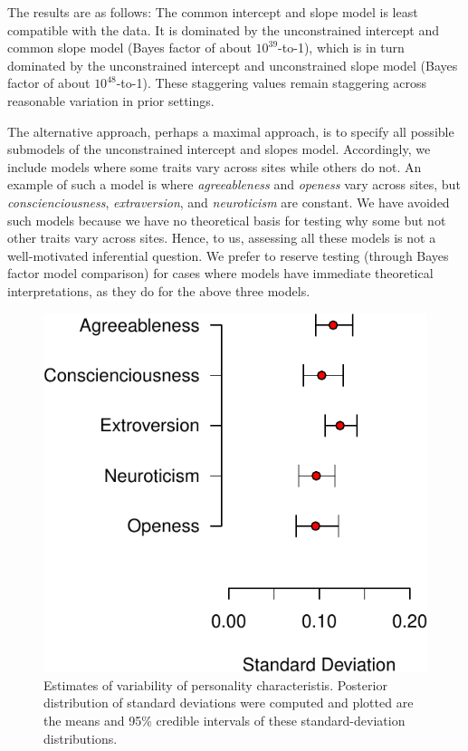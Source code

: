 \documentclass[english,man]{apa6}
\theoremstyle{definition}
\theoremstyle{definition}
\theoremstyle{remark}
\begin{document}
The results are as follows: The common intercept and slope model is
least compatible with the data. It is dominated by the unconstrained
intercept and common slope model (Bayes factor of about
\(10^{39}\)-to-1), which is in turn dominated by the unconstrained
intercept and unconstrained slope model (Bayes factor of about
\(10^{48}\)-to-1). These staggering values remain staggering across
reasonable variation in prior settings.

The alternative approach, perhaps a maximal approach, is to specify all
possible submodels of the unconstrained intercept and slopes model.
Accordingly, we include models where some traits vary across sites while
others do not. An example of such a model is where \emph{agreeableness}
and \emph{openess} vary across sites, but \emph{conscienciousness},
\emph{extraversion}, and \emph{neuroticism} are constant. We have
avoided such models because we have no theoretical basis for testing why
some but not other traits vary across sites. Hence, to us, assessing all
these models is not a well-motivated inferential question. We prefer to
reserve testing (through Bayes factor model comparison) for cases where
models have immediate theoretical interpretations, as they do for the
above three models.

\begin{figure}[htbp]
\centering
\includegraphics{p_files/figure-latex/corkEst2-1.pdf}
\caption{\label{fig:corkEst2}Estimates of variability of personality
characteristis. Posterior distribution of standard deviations were
computed and plotted are the means and 95\% credible intervals of these
standard-deviation distributions.}
\end{figure}
\end{document}
